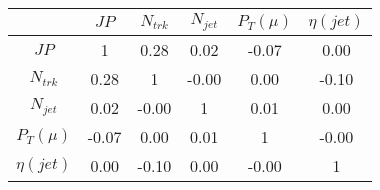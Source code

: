 \begin{tabular}{|c|c|c|c|c|c|} 
\hline
 & $JP$ & $N_{trk}$ & $N_{jet}$ & $P_{T} (\mu)$ & $\eta (jet)$ \\ \hline
$JP$ & 1 & 0.28 & 0.02 & -0.07 & 0.00 \\
$N_{trk}$ & 0.28 & 1 & -0.00 & 0.00 & -0.10 \\
$N_{jet}$ & 0.02 & -0.00 & 1 & 0.01 & 0.00 \\
$P_{T} (\mu)$ & -0.07 & 0.00 & 0.01 & 1 & -0.00 \\
$\eta (jet)$ & 0.00 & -0.10 & 0.00 & -0.00 & 1 \\
\hline 
\end{tabular} 


